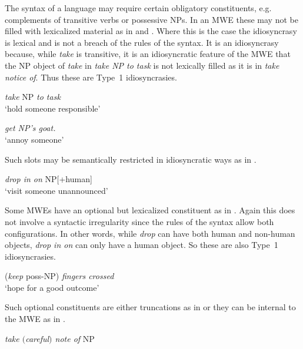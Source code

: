 \documentclass[output=paper]{langsci/langscibook}
\begin{document}
The syntax of a language may require certain obligatory constituents, e.g. 
complements of transitive verbs or possessive NPs. In an MWE these may not 
be filled with lexicalized material as in  and 
. Where this is the case the idiosyncrasy is lexical and is 
not a breach of the rules of the syntax. It is an idiosyncrasy because, 
while \textit{take} is transitive, it is an idiosyncratic feature of the 
MWE that the NP object of \textit{take} in \textit{take NP to task} is not 
lexically filled as it is in \textit{take notice of}. 
Thus these are Type~1 idiosyncrasies.

\begin{exe}
\ex\label{ex:ex31} \textit{take} NP \textit{to task}\\
‘hold someone responsible’



\ex\label{ex:ex32} \textit{get {\normalfont NP}’s goat.}\\
‘annoy someone’
\end{exe}



Such slots may be semantically restricted in idiosyncratic ways as in .

\begin{exe}
\ex\label{ex:ex33} \textit{drop in on} NP[+human]\\
‘visit someone unannounced’
\end{exe}



Some MWEs have an optional but lexicalized constituent as in . Again this does not involve a syntactic irregularity since the rules of the syntax allow both configurations. In other words, while \textit{drop} can have both human and non-human objects, \textit{drop in on} can only have a human object. So these are also Type~1 idiosyncrasies.

\begin{exe}
  \ex\label{ex:ex34} (\textit{keep} poss{}-NP) \textit{fingers crossed}\\
‘hope for a good outcome’
\end{exe}



Such optional constituents are either truncations  as in  or they can be internal to the MWE as in .

\begin{exe}
\ex\label{ex:ex35}  \textit{take $($careful\/$)$ note of} NP
\end{exe}
\end{document}

